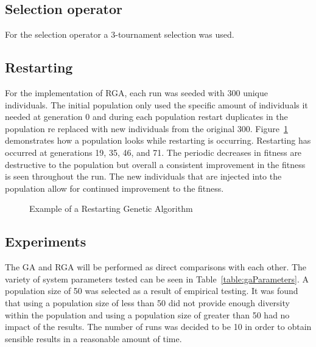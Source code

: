 \documentclass[conference]{IEEEtran}
\begin{document}
\subsection{Selection operator}

For the selection operator a 3-tournament selection was used.

\subsection{Restarting}
\label{subsec:restarting}

For the implementation of RGA, each run was seeded with 300 unique individuals. The initial population only used the specific amount of individuals it needed at generation 0 and during each population restart duplicates in the population re replaced with new individuals from the original 300. Figure~\ref{fig:bestRunRestarting} demonstrates how a population looks while restarting is occurring. Restarting has occurred at generations 19, 35, 46, and 71. The periodic decreases in fitness are destructive to the population but overall a consistent improvement in the fitness is seen throughout the run. The new individuals that are injected into the population allow for continued improvement to the fitness.

\begin{figure}
\begin{center}
\end{center}
\caption{Example of a Restarting Genetic Algorithm}
\label{fig:bestRunRestarting}
\end{figure}

\subsection{Experiments}

The GA and RGA will be performed as direct comparisons with each other. The variety of system parameters tested can be seen in Table~\ref{table:gaParameters}. A population size of 50 was selected as a result of empirical testing. It was found that using a population size of less than 50 did not provide enough diversity within the population and using a population size of greater than 50 had no impact of the results. The number of runs was decided to be 10 in order to obtain sensible results in a reasonable amount of time.
\end{document}
